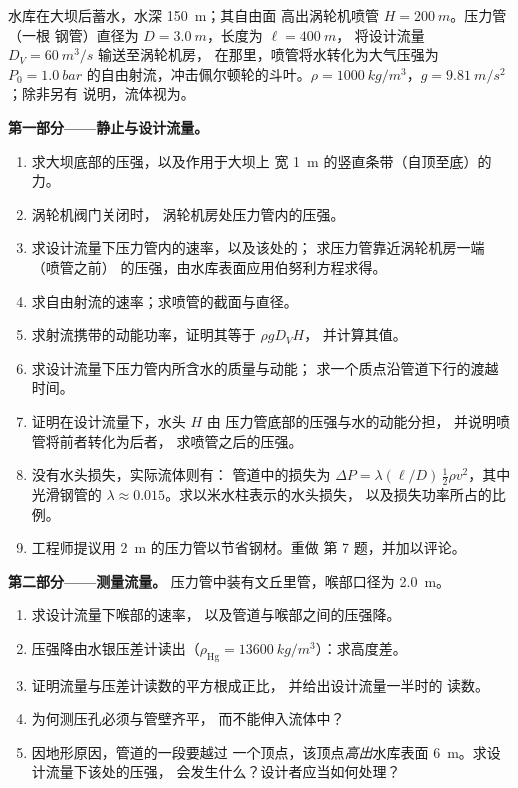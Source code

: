 \begin{problem}
\label{pb:b2:euler-bernoulli:1}

水库在大坝后蓄水，水深 \qty{150}{m}；其自由面
高出涡轮机喷管 $H = \qty{200}{m}$。压力管（一根
钢管）直径为 $D = \qty{3.0}{m}$，长度为 $\ell = \qty{400}{m}$，
将设计流量 $D_V = \qty{60}{m^3/s}$ 输送至涡轮机房，
在那里，喷管将水转化为大气压强为 $P_0 =
\qty{1.0}{bar}$ 的自由射流，冲击佩尔顿轮的斗叶。$\rho =
\qty{1000}{kg/m^3}$，$g = \qty{9.81}{m/s^2}$；除非另有
说明，流体视为。

\medskip
\noindent\textbf{第一部分——静止与设计流量。}
\begin{enumerate}
  \item 求大坝底部的压强，以及作用于大坝上
        宽 \qty{1}{m} 的竖直条带（自顶至底）的力。
  \item 涡轮机阀门关闭时，
        涡轮机房处压力管内的压强。
  \item 求设计流量下压力管内的速率，以及该处的；
        求压力管靠近涡轮机房一端（喷管之前）
        的压强，由水库表面应用伯努利方程求得。
  \item 求自由射流的速率；求喷管的截面与直径。
  \item 求射流携带的动能功率，证明其等于 $\rho gD_VH$，
        并计算其值。
  \item 求设计流量下压力管内所含水的质量与动能；
        求一个质点沿管道下行的渡越时间。
  \item 证明在设计流量下，水头 $H$ 由
        压力管底部的压强与水的动能分担，
        并说明喷管将前者转化为后者，
        求喷管之后的压强。
  \item {}没有水头损失，实际流体则有：
        管道中的损失为 $\Delta P = \lambda(\ell/D)\,\tfrac12\rho v^2$，其中光滑钢管的 $\lambda
        \approx 0.015$。求以米水柱表示的水头损失，
        以及损失功率所占的比例。
  \item 工程师提议用 \qty{2}{m} 的压力管以节省钢材。重做
        第 7 题，并加以评论。
\end{enumerate}

\medskip
\noindent\textbf{第二部分——测量流量。}
压力管中装有文丘里管，喉部口径为 \qty{2.0}{m}。
\begin{enumerate}[resume]
  \item 求设计流量下喉部的速率，
        以及管道与喉部之间的压强降。
  \item 压强降由水银压差计读出（$\rho_{\text{Hg}} =
        \qty{13600}{kg/m^3}$）：求高度差。
  \item 证明流量与压差计读数的平方根成正比，
        并给出设计流量一半时的
        读数。
  \item 为何测压孔必须与管壁齐平，
        而不能伸入流体中？
  \item 因地形原因，管道的一段要越过
        一个顶点，该顶点\emph{高出}水库表面 \qty{6}{m}。求设计流量下该处的压强，
        会发生什么？设计者应当如何处理？
\end{enumerate}


\end{problem}
